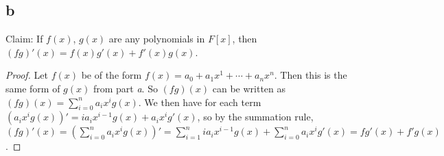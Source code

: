 \documentclass{article}
\begin{document}
\subsection*{b}

Claim: If $f(x)$, $g(x)$ are any polynomials in $F[x]$, then $(fg)'(x) = f(x)g'(x) + f'(x)g(x)$.

\begin{proof}
    Let $f(x)$ be of the form $f(x) = a_0 + a_1 x^1 + \cdots + a_n x^n$.  Then this is the 
    same form of $g(x)$ from part \textit{a}.  So $(fg)(x)$ can be written as 
    $(fg)(x) = \sum _{i=0} ^n a_i x^i g(x)$.  We then have for each term 
    $(a_i x^i g(x))' = i a_i x^{i-1}g(x) + a_i x^i g'(x)$, so by the summation rule, 
    $(fg)'(x) = (\sum _{i=0} ^n a_i x^i g(x))' = \sum_{i=1}^n i a_i x^{i-1}g(x) + 
    \sum_{i=0}^n a_i x^i g'(x) = fg'(x) + f'g(x)$.
\end{proof}
\end{document}
